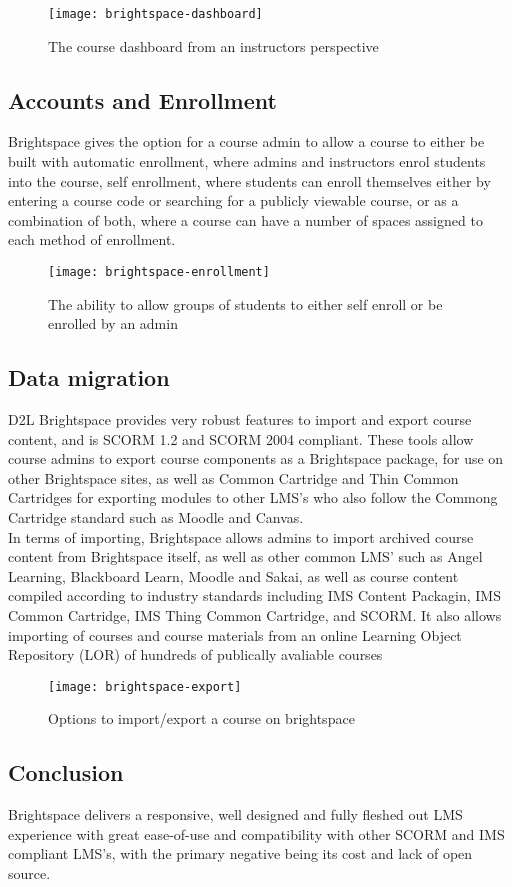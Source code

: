 \begin{figure}
\centering
\texttt{[image: brightspace-dashboard]}
\caption{The course dashboard from an instructors perspective}
\end{figure}

\subsection{Accounts and Enrollment}
Brightspace gives the option for a course admin to allow a course to either be built with automatic enrollment, where admins and instructors enrol students into the course, self enrollment, where students can enroll themselves either by entering a course code or searching for a publicly viewable course, or as a combination of both, where a course can have a number of spaces assigned to each method of enrollment.

\begin{figure}
\centering
\texttt{[image: brightspace-enrollment]}
\caption{The ability to allow groups of students to either self enroll or be enrolled by an admin}
\end{figure}

\subsection{Data migration}
D2L Brightspace provides very robust features to import and export course content, and is SCORM 1.2 and SCORM 2004 compliant. These tools allow course admins to export course components as a Brightspace package, for use on other Brightspace sites, as well as Common Cartridge and Thin Common Cartridges for exporting modules to other LMS's who also follow the Commong Cartridge standard such as Moodle and Canvas.\\
In terms of importing, Brightspace allows admins to import archived course content from Brightspace itself, as well as other common LMS' such as Angel Learning, Blackboard Learn, Moodle and Sakai, as well as course content compiled according to industry standards including IMS Content Packagin, IMS Common Cartridge, IMS Thing Common Cartridge, and SCORM. It also allows importing of courses and course materials from an online Learning Object Repository (LOR) of hundreds of publically avaliable courses\\

\begin{figure}
\centering
\texttt{[image: brightspace-export]}
\caption{Options to import/export a course on brightspace}
\end{figure}

\subsection{Conclusion}
Brightspace delivers a responsive, well designed and fully fleshed out LMS experience with great ease-of-use and compatibility with other SCORM and IMS compliant LMS's, with the primary negative being its cost and lack of open source.
